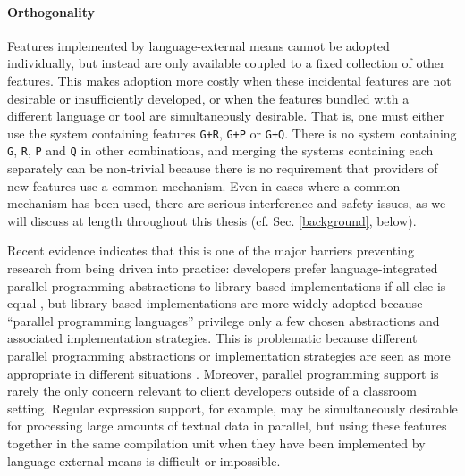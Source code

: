 \paragraph{Orthogonality} Features implemented by language-external means cannot be adopted individually, but instead are only available coupled to a fixed collection of other features. This makes adoption more costly when these incidental features are  not desirable or insufficiently developed, or when the features bundled with a different language or tool are simultaneously desirable. That is, one must either use the system containing features \texttt{G+R}, \texttt{G+P} or \texttt{G+Q}. There is no system containing \texttt{G}, \texttt{R}, \texttt{P} and \texttt{Q} in other combinations, and merging the systems containing each separately can be non-trivial because there is no requirement that providers of new features use a common mechanism. Even in cases where a common mechanism has been used, there are serious interference and safety issues, as we will discuss at length throughout this thesis (cf. Sec. \ref{background}, below).

Recent evidence indicates that this is one of the major barriers preventing research from being driven into practice: developers prefer language-integrated parallel programming abstractions to library-based implementations if all else is equal \cite{cave2010comparing}, but library-based implementations are more widely adopted because ``parallel programming languages'' privilege only a few chosen  abstractions and associated implementation strategies. This is problematic because different parallel programming abstractions or implementation strategies are seen as more appropriate in different situations \cite{Tasharofi:2013rc}. Moreover,  parallel programming support is rarely the only concern relevant to client developers outside of a classroom setting. Regular expression support, for example, may be simultaneously desirable for processing large amounts of textual data in parallel, but using these features together in the same compilation unit when they have been implemented by language-external means is difficult or impossible.  %


